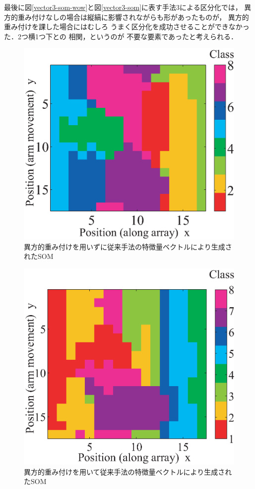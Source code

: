 ﻿\documentclass[12pt,oneside]{jsbook}
\begin{document}
最後に図\ref{vector3-som-wow}と図\ref{vector3-som}に表す手法3による区分化では，
異方的重み付けなしの場合は縦縞に影響されながらも形があったものが，
異方的重み付けを課した場合にはむしろ
うまく区分化を成功させることができなかった．2つ横1つ下との
相関，というのが
不要な要素であったと考えられる．

\clearpage
\begin{figure}[btp]
\includegraphics[width =\hsize ]{20160726_mine1_som5.eps}
\caption{異方的重み付けを用いずに従来手法の特徴量ベクトルにより生成されたSOM}
\label{vector0-som-wow}
\end{figure}

\begin{figure}[btp]
\includegraphics[width =\hsize ]{SOM_170131_wh5.eps}
\caption{異方的重み付けを用いて従来手法の特徴量ベクトルにより生成されたSOM}
\label{vector0-som}
\end{figure}
\end{document}
